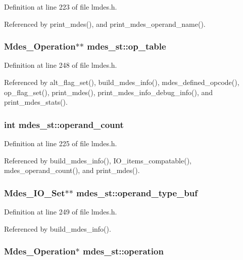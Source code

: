 Definition at line 223 of file lmdes.h.

Referenced by print\_\-mdes(), and print\_\-mdes\_\-operand\_\-name().
\subsubsection{\setlength{\rightskip}{0pt plus 5cm}\bf{Mdes\_\-Operation}$\ast$$\ast$ \bf{mdes\_\-st::op\_\-table}}\label{structmdes__st_2c96f25951773052039f2a6835b397f8}




Definition at line 248 of file lmdes.h.

Referenced by alt\_\-flag\_\-set(), build\_\-mdes\_\-info(), mdes\_\-defined\_\-opcode(), op\_\-flag\_\-set(), print\_\-mdes(), print\_\-mdes\_\-info\_\-debug\_\-info(), and print\_\-mdes\_\-stats().
\subsubsection{\setlength{\rightskip}{0pt plus 5cm}int \bf{mdes\_\-st::operand\_\-count}}\label{structmdes__st_94d3ba15b112518d03a1b35489d1a558}




Definition at line 225 of file lmdes.h.

Referenced by build\_\-mdes\_\-info(), IO\_\-items\_\-compatable(), mdes\_\-operand\_\-count(), and print\_\-mdes().
\subsubsection{\setlength{\rightskip}{0pt plus 5cm}\bf{Mdes\_\-IO\_\-Set}$\ast$$\ast$ \bf{mdes\_\-st::operand\_\-type\_\-buf}}\label{structmdes__st_075df46e855d98a350f0e8aa6ae3490e}




Definition at line 249 of file lmdes.h.

Referenced by build\_\-mdes\_\-info().
\subsubsection{\setlength{\rightskip}{0pt plus 5cm}\bf{Mdes\_\-Operation}$\ast$ \bf{mdes\_\-st::operation}}\label{structmdes__st_985578aacd1a7fc65ac03a323bc5ff84}




